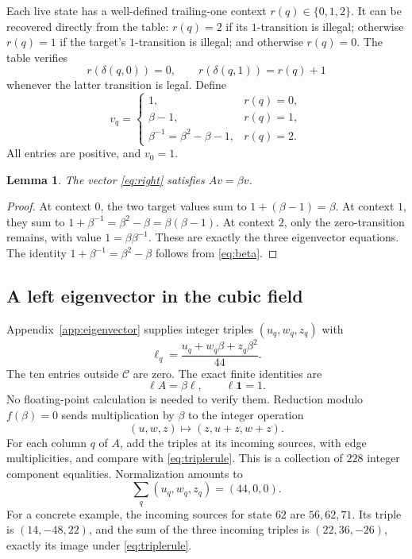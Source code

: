 \documentclass[11pt,a4paper]{article}
\newtheorem{lemma}[theorem]{Lemma}
\theoremstyle{definition}
\theoremstyle{remark}
\newcommand{\one}{\mathbf 1}
\newcommand{\cc}{\mathcal C}
\begin{document}
Each live state has a well-defined trailing-one context $r(q)\in\{0,1,2\}$.
It can be recovered directly from the table: $r(q)=2$ if its $1$-transition
is illegal; otherwise $r(q)=1$ if the target's $1$-transition is illegal;
and otherwise $r(q)=0$. The table verifies
\[
 r(\delta(q,0))=0,
 \qquad r(\delta(q,1))=r(q)+1
\]
whenever the latter transition is legal. Define
\begin{equation}\label{eq:right}
 v_q=
 \begin{cases}
 1,&r(q)=0,\\
 \beta-1,&r(q)=1,\\
 \beta^{-1}=\beta^2-\beta-1,&r(q)=2.
 \end{cases}
\end{equation}
All entries are positive, and $v_0=1$.

\begin{lemma}\label{lem:right}
The vector \eqref{eq:right} satisfies $Av=\beta v$.
\end{lemma}
\begin{proof}
At context $0$, the two target values sum to $1+(\beta-1)=\beta$.
At context $1$, they sum to $1+\beta^{-1}=\beta^2-\beta
=\beta(\beta-1)$. At context $2$, only the zero-transition remains,
with value $1=\beta\beta^{-1}$. These are exactly the three eigenvector
equations. The identity $1+\beta^{-1}=\beta^2-\beta$ follows from
\eqref{eq:beta}.
\end{proof}

\subsection{A left eigenvector in the cubic field}
Appendix~\ref{app:eigenvector} supplies integer triples $(u_q,w_q,z_q)$
with
\begin{equation}\label{eq:left}
 \ell_q=\frac{u_q+w_q\beta+z_q\beta^2}{44}.
\end{equation}
The ten entries outside $\cc$ are zero. The exact finite identities are
\begin{equation}\label{eq:leftcert}
 \ell A=\beta\ell,\qquad \ell\one=1.
\end{equation}
No floating-point calculation is needed to verify them. Reduction modulo
$f(\beta)=0$ sends multiplication by $\beta$ to the integer operation
\begin{equation}\label{eq:triplerule}
 (u,w,z)\longmapsto(z,u+z,w+z).
\end{equation}
For each column $q$ of $A$, add the triples at its incoming sources, with
edge multiplicities, and compare with \eqref{eq:triplerule}. This is a
collection of $228$ integer component equalities. Normalization amounts to
\[
 \sum_q(u_q,w_q,z_q)=(44,0,0).
\]
For a concrete example, the incoming sources for state $62$ are $56,62,71$.
Its triple is $(14,-48,22)$, and the sum of the three incoming triples is
$(22,36,-26)$, exactly its image under \eqref{eq:triplerule}.
\end{document}
